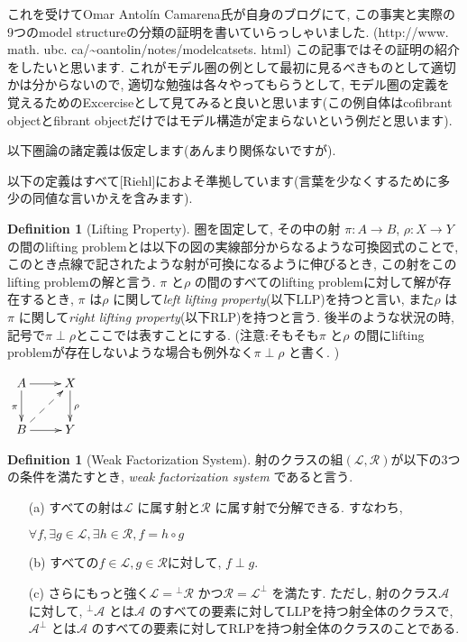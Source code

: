 \documentclass[. /main]{subfiles}
\theoremstyle{definition}
\newtheorem{defi}[theo]{Definition}
\begin{document}
これを受けてOmar Antolín Camarena氏が自身のブログにて, この事実と実際の9つのmodel structureの分類の証明を書いていらっしゃいました. (http://www. math. ubc. ca/\textasciitilde oantolin/notes/modelcatsets. html) \cite{Camarena}この記事ではその証明の紹介をしたいと思います. これがモデル圏の例として最初に見るべきものとして適切かは分からないので, 適切な勉強は各々やってもらうとして, モデル圏の定義を覚えるためのExcerciseとして見てみると良いと思います(この例自体はcofibrant objectとfibrant objectだけではモデル構造が定まらないという例だと思います). 


以下圏論の諸定義は仮定します(あんまり関係ないですが). 

以下の定義はすべて[Riehl]におよそ準拠しています(言葉を少なくするために多少の同値な言いかえを含みます). 
\begin{defi}[Lifting Property]
圏を固定して, その中の射 $\pi \colon A \to B$, $\rho \colon X \to Y$ の間のlifting problemとは以下の図の実線部分からなるような可換図式のことで, このとき点線で記されたような射が可換になるように伸びるとき, この射をこのlifting problemの解と言う. $\pi$ と$\rho$ の間のすべてのlifting problemに対して解が存在するとき, $\pi$ は$\rho$ に関して{\it left lifting property}(以下LLP)を持つと言い, また$\rho$ は$\pi$ に関して{\it right lifting property}(以下RLP)を持つと言う. 後半のような状況の時, 記号で$\pi \perp \rho$とここでは表すことにする. (注意:そもそも$\pi$ と$\rho$ の間にlifting problemが存在しないような場合も例外なく$\pi \perp \rho$ と書く. )
\begin{center}
$\xymatrix{
A \ar[d]_{\pi} \ar[r] \ar@{}[dr] & X \ar[d]^{\rho} \\
B \ar@{-->}[ru] \ar[r] & Y \\
}$
\end{center}
\end{defi}

\begin{defi}[Weak Factorization System]
射のクラスの組$(\mathcal{L},  \mathcal{R})$が以下の3つの条件を満たすとき, {\it weak factorization system} であると言う. 
\begin{itemize}
\item[(a)] すべての射は$\mathcal{L}$ に属す射と$\mathcal{R}$ に属す射で分解できる. すなわち, 
\begin{center}
$\forall f,  \exists g \in \mathcal{L},  \exists h \in \mathcal{R},  f = h \circ g$
\end{center}
\item[(b)] すべての$f \in \mathcal{L},  g \in \mathcal{R}$に対して, $f \perp g$. 
\item[(c)] さらにもっと強く$\mathcal{L} = {}^{\perp}\mathcal{R}$ かつ$\mathcal{R
} = {\mathcal{L}}^{\perp}$ を満たす. ただし, 射のクラス$\mathcal{A}$ に対して, ${}^{\perp}\mathcal{A}$ とは$\mathcal{A}$ のすべての要素に対してLLPを持つ射全体のクラスで, ${\mathcal{A}}^{\perp}$ とは$\mathcal{A}$ のすべての要素に対してRLPを持つ射全体のクラスのことである. 
\end{itemize}
\end{defi}
\end{document}

